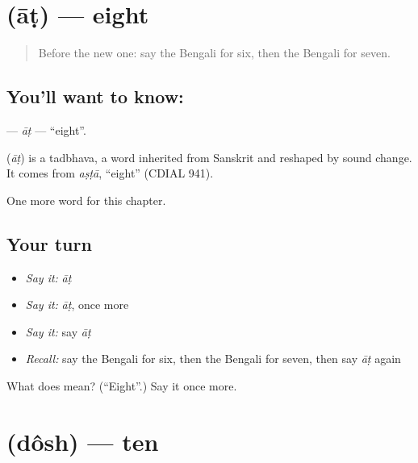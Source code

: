 \section[\texorpdfstring{\bn{আট} (āṭ)}{আট (āṭ)}]{ (āṭ) — eight}

\label{lesson:BN-C86-at}



\begin{quote}
Before the new one: say the Bengali for six, then the Bengali for seven.
\end{quote}

\subsection*{You'll want to know: }
\textbf{} — \emph{āṭ} — \textquotedblleft{}eight\textquotedblright{}.

\begin{cousinweb}
\textbf{} (\emph{āṭ}) is a tadbhava, a word inherited from Sanskrit and reshaped by sound change. It comes from \emph{aṣṭā}, \textquotedblleft{}eight\textquotedblright{} (CDIAL 941).
\end{cousinweb}

\begin{grammarlens}[title={What you've built}]
One more word for this chapter.
\end{grammarlens}

\subsection*{Your turn}
\begin{itemize}
\raggedright
  \item \emph{Say it:} \emph{āṭ}
  \item \emph{Say it:} \emph{āṭ}, once more
  \item \emph{Say it:} say \emph{āṭ}
  \item \emph{Recall:} say the Bengali for six, then the Bengali for seven, then say \emph{āṭ} again
\end{itemize}

\begin{tcolorbox}[breakable,colback=teal!4,colframe=teal!35!black,title={Before you move on}]
What does  mean? (\textquotedblleft{}Eight\textquotedblright{}.) Say it once more.
\end{tcolorbox}
\section[\texorpdfstring{\bn{দশ} (dôsh)}{দশ (dôsh)}]{ (dôsh) — ten}


